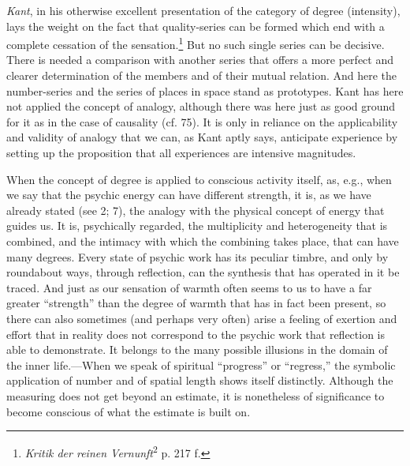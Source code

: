 \documentclass[12pt,a4paper]{book}
\newcommand{\opage}[1]{\marginnote{\footnotesize\textit{[#1]}}}
\begin{document}
\emph{Kant}, in his otherwise excellent presentation of the category of
degree (intensity), lays the weight on the fact that quality-series can be
formed which end with a complete cessation of the sensation.\footnote{\emph{Kritik
der reinen Vernunft}\textsuperscript{2} p. 217 f.} But no such single series
can be decisive. There is needed a comparison with another series that offers
a more perfect and clearer determination of the members and of their mutual
relation. And here the number-series and the series of places in space stand
as prototypes. Kant has here not applied the concept of analogy, although
there was here just as good ground for it as in the case of causality (cf.
75). It is only in reliance on the applicability and validity of analogy that
we can, as Kant aptly says, anticipate experience by setting up the
proposition that all experiences are intensive magnitudes.

When the concept of degree is applied to conscious activity itself, as, e.g.,
when we say that the psychic energy can have different strength, it is, as we
have already stated (see 2; 7), the analogy with the physical concept of
energy that guides us. It is, psychically regarded, the multiplicity and
heterogeneity that is combined, and the intimacy with which the combining
takes place, that can have many degrees. Every state of psychic work has its
peculiar timbre, and only by roundabout ways, through reflection, can the
synthesis that has operated in it be traced. And just as our sensation of
warmth often seems to us to have a far greater ``strength'' than the degree
of warmth that has in fact been present, so there can also sometimes (and
perhaps very often) arise a feeling of exertion and effort that in \opage{196}reality
does not correspond to the psychic work that reflection is able to
demonstrate. It belongs to the many possible illusions in the domain of the
inner life.---When we speak of spiritual ``progress'' or ``regress,'' the
symbolic application of number and of spatial length shows itself distinctly.
Although the measuring does not get beyond an estimate, it is nonetheless of
significance to become conscious of what the estimate is built on.
\end{document}
